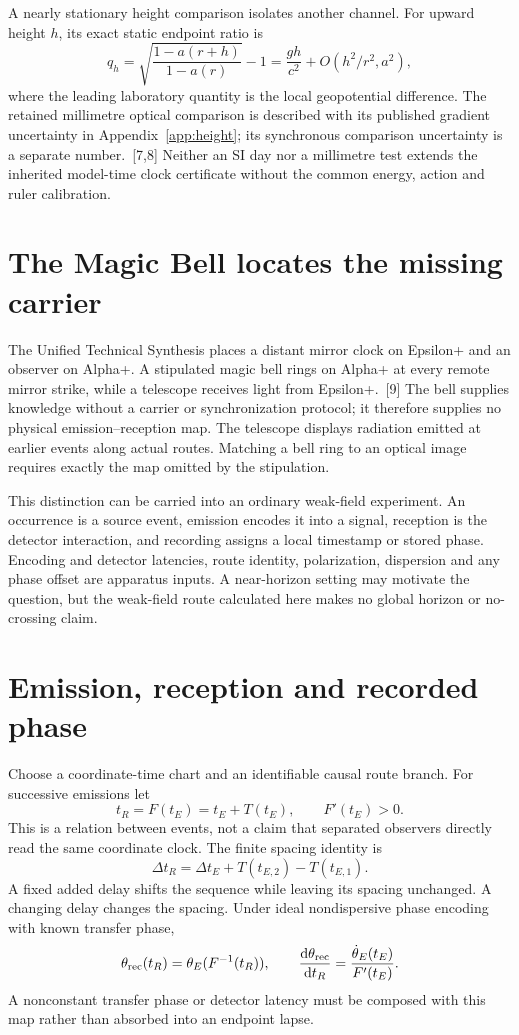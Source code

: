 \documentclass[10pt,twocolumn,letterpaper]{article}
\newcommand{\dd}{\mathrm{d}}
\begin{document}
A nearly stationary height comparison isolates another channel. For upward height $h$, its exact static endpoint ratio is
\[
 q_h=\sqrt{\frac{1-a(r+h)}{1-a(r)}}-1
      =\frac{gh}{c^2}+O(h^2/r^2,a^2),
\]
where the leading laboratory quantity is the local geopotential difference. The retained millimetre optical comparison is described with its published gradient uncertainty in Appendix~\ref{app:height}; its synchronous comparison uncertainty is a separate number.~[7,8] Neither an SI day nor a millimetre test extends the inherited model-time clock certificate without the common energy, action and ruler calibration.

\section{The Magic Bell locates the missing carrier}
The Unified Technical Synthesis places a distant mirror clock on Epsilon+ and an observer on Alpha+. A stipulated magic bell rings on Alpha+ at every remote mirror strike, while a telescope receives light from Epsilon+.~[9] The bell supplies knowledge without a carrier or synchronization protocol; it therefore supplies no physical emission--reception map. The telescope displays radiation emitted at earlier events along actual routes. Matching a bell ring to an optical image requires exactly the map omitted by the stipulation.

This distinction can be carried into an ordinary weak-field experiment. An occurrence is a source event, emission encodes it into a signal, reception is the detector interaction, and recording assigns a local timestamp or stored phase. Encoding and detector latencies, route identity, polarization, dispersion and any phase offset are apparatus inputs. A near-horizon setting may motivate the question, but the weak-field route calculated here makes no global horizon or no-crossing claim.

\section{Emission, reception and recorded phase}
Choose a coordinate-time chart and an identifiable causal route branch. For successive emissions let
\[
 t_R=F(t_E)=t_E+T(t_E),\qquad F'(t_E)>0.
\]
This is a relation between events, not a claim that separated observers directly read the same coordinate clock. The finite spacing identity is
\[
 \Delta t_R=\Delta t_E+T(t_{E,2})-T(t_{E,1}).
\]
A fixed added delay shifts the sequence while leaving its spacing unchanged. A changing delay changes the spacing. Under ideal nondispersive phase encoding with known transfer phase,
\[
 \theta_{\rm rec}(t_R)=\theta_E(F^{-1}(t_R)),\qquad
 \frac{\dd\theta_{\rm rec}}{\dd t_R}=\frac{\dot\theta_E(t_E)}{F'(t_E)}.
\]
A nonconstant transfer phase or detector latency must be composed with this map rather than absorbed into an endpoint lapse.
\end{document}
